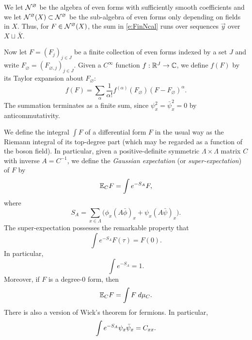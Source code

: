 We let $\mathcal{N}^\varnothing$ be the algebra of even forms with sufficiently smooth coefficients
and we let $\mathcal{N}^\varnothing(X) \subset \mathcal{N}^\varnothing$ be the sub-algebra of even forms only depending on fields
in $X$. Thus, for $F \in \mathcal{N}^\varnothing(X)$, the sum in \eqref{e:FinNcal} runs over sequences $\vec y$
over $X \sqcup \bar X$.

Now let $F = (F_j)_{j \in J}$ be a finite collection of even forms
indexed by a set $J$
and write $F_\varnothing = (F_{\varnothing,j})_{j \in J}$.
Given a $C^\infty$ function $f : {\mathbb R}^J \rightarrow \mathbb{C}$, we define
$f(F)$ by its Taylor expansion about $F_\varnothing$:
\begin{equation}
f(F) = \sum_\alpha \frac{1}{\alpha!} f^{(\alpha)}(F_\varnothing) (F - F_\varnothing)^\alpha.
\end{equation}
The summation terminates as a finite sum, since $\psi_x^2 = \bar\psi_x^2 = 0$
by anticommutativity.

We define the integral $\int F$ of a differential form $F$ in the usual way
as the Riemann integral of its top-degree part (which may be regarded as a function
of the boson field).
In particular, given a positive-definite symmetric
$\Lambda \times \Lambda$ matrix $C$ with inverse $A = C^{-1}$,
we define the \emph{Gaussian expectation} (or \emph{super-expectation}) of $F$ by
\begin{equation}
\lbeq{ExCF}
\Ex_C F = \int e^{-S_A} F,
\end{equation}
where
\begin{equation}
\label{e:action}
S_A = \sum_{x\in\Lambda} \Big(\phi_x (A\bar\phi)_x + \psi_x (A \bar\psi)_x\Big).
\end{equation}
The super-expectation possesses the remarkable property that
\begin{equation}
\label{e:tau-iso}
\int e^{-S_A} F(\tau) = F(0).
\end{equation}
In particular,
\begin{equation}
\label{e:self-normal}
\int e^{-S_A} = 1.
\end{equation}
Moreover, if $F$ is a degree-$0$ form, then
\begin{equation}
\mathbb{E}_C F = \int F \; d\mu_C.
\end{equation}
There is also a version of Wick's theorem for fermions. In particular,
\begin{equation}
\label{e:wick-fermion2}
\int e^{-S_A} \psi_x \bar\psi_x = C_{xx}.
\end{equation}

